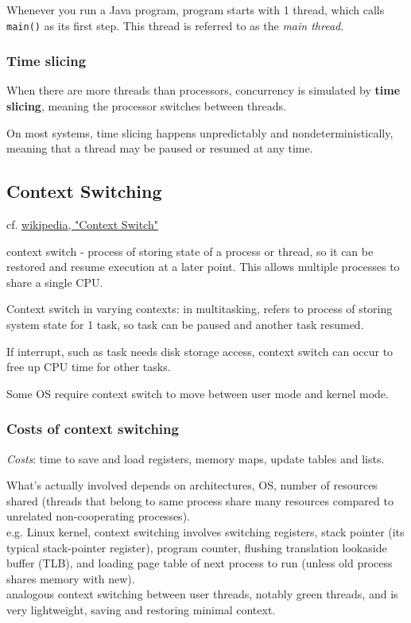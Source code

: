 \documentclass[10pt]{amsart}
\begin{document}
\begin{multicols*}{2}
Whenever you run a Java program, program starts with 1 thread, which calls \verb|main()| as its first step. This thread is referred to as the \emph{main thread}.

\subsubsection{Time slicing}

When there are more threads than processors, concurrency is simulated by \textbf{time slicing}, meaning the processor switches between threads.

On most systems, time slicing happens unpredictably and nondeterministically, meaning that a thread may be paused or resumed at any time.

\subsection{Context Switching}

cf. \href{https://en.wikipedia.org/wiki/Context_switch}{wikipedia, "Context Switch"}

context switch - process of storing state of a process or thread, so it can be restored and resume execution at a later point. This allows multiple processes to share a single CPU.

Context switch in varying contexts: in multitasking, refers to process of storing system state for 1 task, so task can be paused and another task resumed.

If interrupt, such as task needs disk storage access, context switch can occur to free up CPU time for other tasks.

Some OS require context switch to move between user mode and kernel mode.

\subsubsection{Costs of context switching}

\emph{Costs}: time to save and load registers, memory maps, update tables and lists.

What's actually involved depends on architectures, OS, number of resources shared (threads that belong to same process share many resources compared to unrelated non-cooperating processes). \\
e.g. Linux kernel, context switching involves switching registers, stack pointer (its typical stack-pointer register), program counter, flushing translation lookaside buffer (TLB), and loading page table of next process to run (unless old process shares memory with new).  \\
analogous context switching between user threads, notably green threads, and is very lightweight, saving and restoring minimal context. \\


\end{multicols*}
\end{document}
